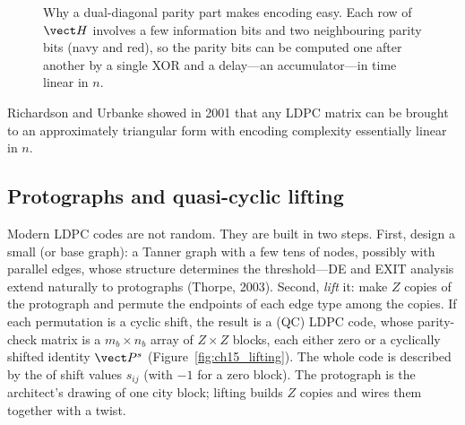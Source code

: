 \begin{figure}[H]\centering
{}
\caption{Why a dual-diagonal parity part makes encoding easy. Each row of $\vect H$ involves a few
information bits and two neighbouring parity bits (navy and red), so the parity bits can be
computed one after another by a single XOR and a delay---an accumulator---in time linear in $n$.}
\label{fig:ch15_accumulator}
\end{figure} Richardson and
Urbanke showed in 2001 that any LDPC matrix can be brought to an approximately triangular form with
encoding complexity essentially linear in $n$.

\subsection{Protographs and quasi-cyclic lifting}

Modern LDPC codes are not random. They are built in two steps. First, design a small
 (or base graph): a Tanner graph with a few tens of nodes, possibly with parallel
edges, whose structure determines the threshold---DE and EXIT analysis extend naturally to
protographs (Thorpe, 2003). Second, \emph{lift} it: make $Z$ copies of the protograph and permute the
endpoints of each edge type among the copies. If each permutation is a cyclic shift, the result is a
 (QC) LDPC code, whose parity-check matrix is a $m_b\times n_b$ array of
$Z\times Z$ blocks, each either zero or a cyclically shifted identity $\vect P^{s}$
(Figure~\ref{fig:ch15_lifting}). The whole code is described by the  of shift values
$s_{ij}$ (with $-1$ for a zero block). The protograph is the architect's drawing of one city block;
lifting builds $Z$ copies and wires them together with a twist.

